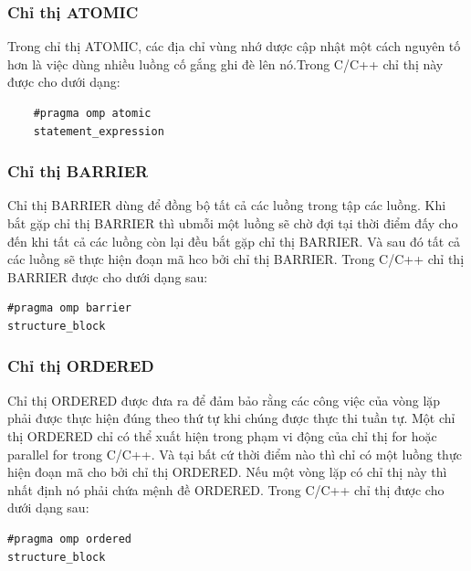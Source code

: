 \documentclass{report}
\begin{document}
	\subsubsection{Chỉ thị ATOMIC}
	Trong chỉ thị \textsf{ATOMIC}, các địa chỉ vùng nhớ dược cập nhật một cách nguyên tố hơn là việc dùng nhiều luồng cố gắng ghi đè lên nó.Trong C/C++ chỉ thị này được cho dưới dạng:
	\begin{verbatim}
	#pragma omp atomic
	statement_expression
	\end{verbatim}

\subsubsection{Chỉ thị BARRIER}
Chỉ thị \textsf{BARRIER} dùng để đồng bộ tất cả các luồng trong tập các luồng. Khi bắt gặp chỉ thị \textsf{BARRIER} thì ubmỗi một luồng sẽ chờ đợi tại thời điểm đấy cho đến khi tất cả các luồng còn lại đều bắt gặp chỉ thị \textsf{BARRIER}. Và sau đó tất cả các luồng sẽ thực hiện đoạn mã hco bởi chỉ thị \textsf{BARRIER}. Trong C/C++ chỉ thị \textsf{BARRIER} được cho dưới dạng sau: 
\begin{verbatim}
#pragma omp barrier 
structure_block
\end{verbatim}

\subsubsection{Chỉ thị ORDERED}
Chỉ thị \textsf{ORDERED} được đưa ra để đảm bảo rằng các công việc của vòng lặp phải được thực hiện đúng theo thứ tự khi chúng được thực thi tuần tự. Một chỉ thị \textsf{ORDERED} chỉ có thể xuất hiện trong phạm vi động của chỉ thị for hoặc parallel for trong C/C++. Và tại bất cứ thời điểm nào thì chỉ có một luồng thực hiện đoạn mã cho bởi chỉ thị \textsf{ORDERED}. Nếu một vòng lặp có chỉ thị này thì nhất định nó phải chứa mệnh đề \textsf{ORDERED}. Trong C/C++ chỉ thị được cho dưới dạng sau: 
\begin{verbatim}
#pragma omp ordered
structure_block
\end{verbatim}
\end{document}

